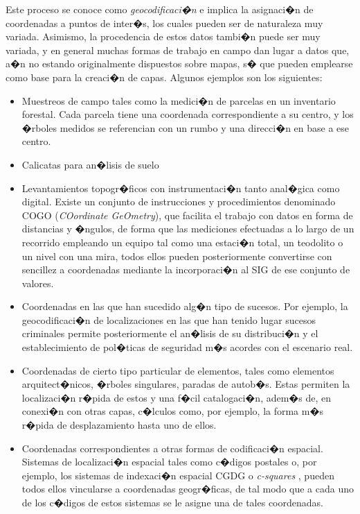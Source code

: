 Este proceso se conoce como \emph{geocodificaci�n} \cite{Davis2003Geoinfo} e implica la asignaci�n de coordenadas a puntos de inter�s, los cuales pueden ser de naturaleza muy variada. Asimismo, la procedencia de estos datos tambi�n puede ser muy variada, y en general muchas formas de trabajo en campo dan lugar a datos que, a�n no estando originalmente dispuestos sobre mapas, s� que pueden emplearse como base para la creaci�n de capas. Algunos ejemplos son los siguientes:

\begin{itemize}
	\item Muestreos de campo tales como la medici�n de parcelas en un inventario forestal. Cada parcela tiene una coordenada correspondiente a su centro, y los �rboles medidos se referencian con un rumbo y una direcci�n en base a ese centro.
	\item Calicatas para an�lisis de suelo
	\item Levantamientos topogr�ficos con instrumentaci�n tanto anal�gica como digital. Existe un conjunto de instrucciones y procedimientos denominado COGO (\emph{COordinate GeOmetry}), que facilita el trabajo con datos en forma de distancias y �ngulos, de forma que las mediciones efectuadas a lo largo de un recorrido empleando un equipo tal como una estaci�n total, un teodolito o un nivel con una mira, todos ellos pueden posteriormente convertirse con sencillez a coordenadas mediante la incorporaci�n al SIG de ese conjunto de valores.
	\item Coordenadas en las que han sucedido alg�n tipo de sucesos. Por ejemplo, la geocodificaci�n de localizaciones en las que han tenido lugar sucesos criminales permite posteriormente el an�lisis de su distribuci�n y el establecimiento de pol�ticas de seguridad m�s acordes con el escenario real.
	\item Coordenadas de cierto tipo particular de elementos, tales como elementos arquitect�nicos, �rboles singulares, paradas de autob�s. Estas permiten la localizaci�n r�pida de estos y una f�cil catalogaci�n, adem�s de, en conexi�n con otras capas, c�lculos como, por ejemplo, la forma m�s r�pida de desplazamiento hasta uno de ellos.
	\item Coordenadas correspondientes a otras formas de codificaci�n espacial. Sistemas de localizaci�n espacial tales como c�digos postales o, por ejemplo, los sistemas de indexaci�n espacial CGDG o \emph{c-squares} \cite{WebCSquares}, pueden todos ellos vincularse a coordenadas geogr�ficas, de tal modo que a cada uno de los c�digos de estos sistemas se le asigne una de tales coordenadas.

\end{itemize}
